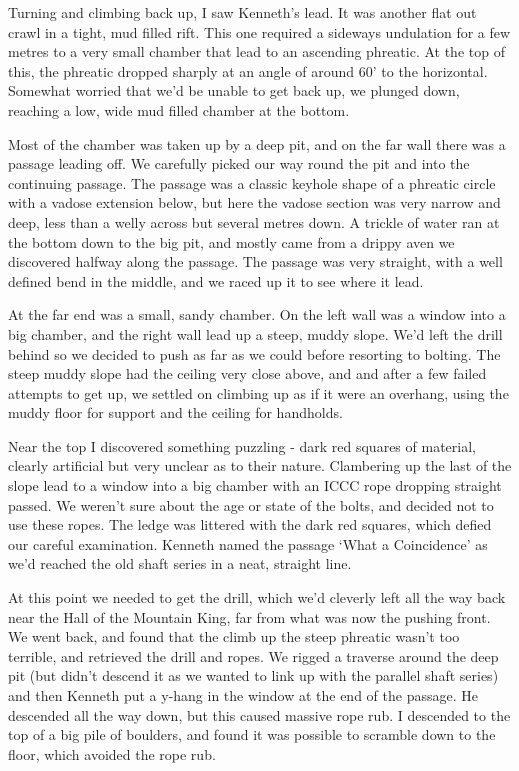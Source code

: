 Turning and climbing back up, I saw Kenneth’s lead. It was another flat out crawl in a tight, mud filled rift. This one required a sideways undulation for a few metres to a very small chamber that lead to an ascending phreatic. At the top of this, the phreatic dropped sharply at an angle of around 60’ to the horizontal. Somewhat worried that we’d be unable to get back up, we plunged down, reaching a low, wide mud filled chamber at the bottom.
 
Most of the chamber was taken up by a deep pit, and on the far wall there was a passage leading off. We carefully picked our way round the pit and into the continuing passage. The passage was a classic keyhole shape of a phreatic circle with a vadose extension below, but here the vadose section was very narrow and deep, less than a welly across but several metres down. A trickle of water ran at the bottom down to the big pit, and mostly came from a drippy aven we discovered halfway along the passage. The passage was very straight, with a well defined bend in the middle, and we raced up it to see where it lead.
 
At the far end was a small, sandy chamber. On the left wall was a window into a big chamber, and the right wall lead up a steep, muddy slope. We’d left the drill behind so we decided to push as far as we could before resorting to bolting. The steep muddy slope had the ceiling very close above, and and after a few failed attempts to get up, we settled on climbing up as if it were an overhang, using the muddy floor for support and the ceiling for handholds.
 
Near the top I discovered something puzzling - dark red squares of material, clearly artificial but very unclear as to their nature. Clambering up the last of the slope lead to a window into a big chamber with an ICCC rope dropping straight passed. We weren’t sure about the age or state of the bolts, and decided not to use these ropes. The ledge was littered with the dark red squares, which defied our careful examination. Kenneth named the passage ‘What a Coincidence’ as we’d reached the old shaft series in a neat, straight line.
 
At this point we needed to get the drill, which we’d cleverly left all the way back near the Hall of the Mountain King, far from what was now the pushing front. We went back, and found that the climb up the steep phreatic wasn’t too terrible, and retrieved the drill and ropes. We rigged a traverse around the deep pit (but didn’t descend it as we wanted to link up with the parallel shaft series) and then Kenneth put a y-hang in the window at the end of the passage. He descended all the way down, but this caused massive rope rub. I descended to the top of a big pile of boulders, and found it was possible to scramble down to the floor, which avoided the rope rub.
 

